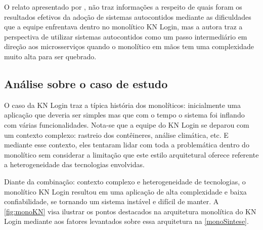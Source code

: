 O relato apresentado por , não traz informações a respeito
de quais foram os resultados efetivos da adoção de sistemas autocontidos mediante as dificuldades
que a equipe enfrentava dentro no monolítico KN Login, mas a autora traz a perspectiva de utilizar
sistemas autocontidos como um passo intermediário em direção aos microsserviços quando o monolítico
em mãos tem uma complexidade muito alta para ser quebrado.

\subsection{Análise sobre o caso de estudo}

O caso da KN Login traz a típica história dos monolíticos: inicialmente uma aplicação que deveria
ser simples mas que com o tempo o sistema foi inflando com várias funcionalidades. Nota-se que a
equipe do KN Login se deparou com um contexto complexo: rastreio dos contêineres, análise climática,
etc. E mediante esse contexto, eles tentaram lidar com toda a problemática dentro do monolítico sem
considerar a limitação que este estilo arquitetural oferece referente a heterogeneidade das
tecnologias envolvidas.

Diante da combinação: contexto complexo e heterogeneidade de tecnologias, o monolítico KN Login
resultou em uma aplicação de alta complexidade e baixa confiabilidade, se tornando um sistema
instável e difícil de manter. A \autoref{fig:monoKN} visa ilustrar os pontos destacados na
arquitetura monolítica do KN Login mediante aos fatores levantados sobre essa arquitetura na
\autoref{monoSintese}. 

